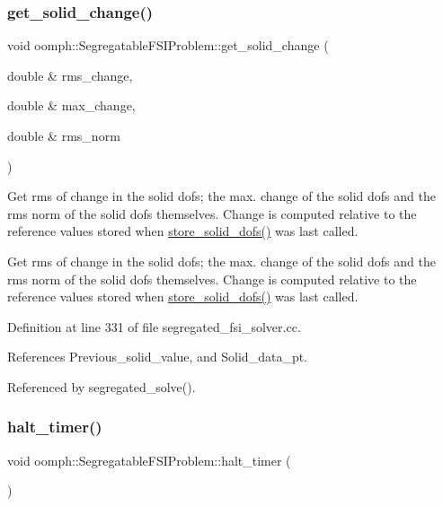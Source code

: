 \subsubsection{\texorpdfstring{get\+\_\+solid\+\_\+change()}{get\_solid\_change()}}
{\footnotesize\ttfamily void oomph\+::\+Segregatable\+F\+S\+I\+Problem\+::get\+\_\+solid\+\_\+change (\begin{DoxyParamCaption}\item[{double \&}]{rms\+\_\+change,  }\item[{double \&}]{max\+\_\+change,  }\item[{double \&}]{rms\+\_\+norm }\end{DoxyParamCaption})}



Get rms of change in the solid dofs; the max. change of the solid dofs and the rms norm of the solid dofs themselves. Change is computed relative to the reference values stored when \hyperlink{classoomph_1_1SegregatableFSIProblem_af6a9e7b6f13b86bf86b65cfb7c4f966f}{store\+\_\+solid\+\_\+dofs()} was last called. 

Get rms of change in the solid dofs; the max. change of the solid dofs and the rms norm of the solid dofs themselves. Change is computed relative to the reference values stored when \hyperlink{classoomph_1_1SegregatableFSIProblem_af6a9e7b6f13b86bf86b65cfb7c4f966f}{store\+\_\+solid\+\_\+dofs()} was last called. 

Definition at line 331 of file segregated\+\_\+fsi\+\_\+solver.\+cc.



References Previous\+\_\+solid\+\_\+value, and Solid\+\_\+data\+\_\+pt.



Referenced by segregated\+\_\+solve().

\mbox{\label{classoomph_1_1SegregatableFSIProblem_a6282056a5c22b707a1e6c939a3f73dcd}} 
\subsubsection{\texorpdfstring{halt\+\_\+timer()}{halt\_timer()}}
{\footnotesize\ttfamily void oomph\+::\+Segregatable\+F\+S\+I\+Problem\+::halt\+\_\+timer (\begin{DoxyParamCaption}{ }\end{DoxyParamCaption})\hspace{0.3cm}{\ttfamily [inline]}}



